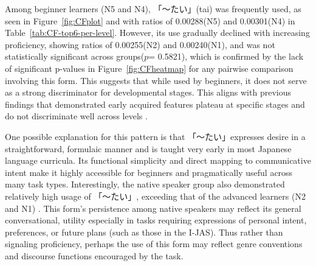 Among beginner learners (N5 and N4), 「〜たい」(tai) was frequently used, as seen in Figure~\ref{fig:CFplot} and with
ratios of 0.00288(N5) and 0.00301(N4) in Table~\ref{tab:CF-top6-per-level}.
However, its
use gradually declined
with
increasing proficiency, showing ratios of 0.00255(N2) and 0.00240(N1), and was not statistically significant across
groups($p$=
0.5821),
which is confirmed by the
lack of
significant p-values in Figure~\ref{fig:CFheatmap} for any pairwise comparison involving this form. This suggests that
while used by beginners, it does not serve as a strong discriminator for developmental stages. This aligns
with previous
findings that demonstrated early acquired features plateau at specific stages and do not discriminate well across
levels \citep{Ortega2003}.

One possible
explanation for this pattern is that 「〜たい」expresses desire in a straightforward, formulaic manner and is taught very
early in most Japanese language curricula. Its functional simplicity and direct mapping to communicative intent make
it highly accessible for beginners and pragmatically useful across many task types. Interestingly, the native
speaker group also demonstrated relatively high usage of 「〜たい」, exceeding that of the advanced learners (N2 and N1)
. This form's persistence among native speakers may reflect its general conversational, utility especially in tasks
requiring expressions of personal intent, preferences, or future plans (such as those in the I-JAS). Thus
rather than
signaling proficiency, perhaps the use of this form may reflect genre conventions and discourse functions encouraged
by the task.


